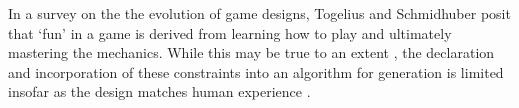\documentclass[11pt, a4paper, oneside]{report} %
\begin{document}



In a survey on the the evolution of game designs, Togelius and Schmidhuber
\cite{5035629} posit that `fun' in a game is derived from learning how to play
and ultimately mastering the mechanics. While this may be true to an extent
\cite{Burgun:2012}, the declaration and incorporation of these constraints into
an algorithm for generation is limited insofar as the design matches human
experience \cite{sorenson2011generic}.




\end{document}
